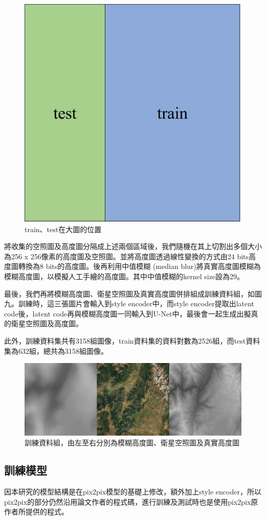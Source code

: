 \documentclass[a4paper, 12pt]{article}
\begin{document}
\begin{figure}[htbp]
    \centering
    \includegraphics[width=0.3\linewidth]{fig/9.jpg}
    \caption{train、test在大圖的位置}
    \label{fig:9}
\end{figure}

將收集的空照圖及高度圖分隔成上述兩個區域後，我們隨機在其上切割出多個大小為256 x 256像素的高度圖及空照圖。並將高度圖透過線性變換的方式由24 bits高度圖轉換為8 bits的高度圖。後再利用中值模糊 (median blur)將真實高度圖模糊為模糊高度圖，以模擬人工手繪的高度圖。其中中值模糊的kernel size設為29。

最後，我們再將模糊高度圖、衛星空照圖及真實高度圖併排組成訓練資料組，如圖九。訓練時，這三張圖片會輸入到style encoder中，而style encoder提取出latent code後，latent code再與模糊高度圖一同輸入到U-Net中，最後會一起生成出擬真的衛星空照圖及高度圖。

此外，訓練資料集共有3158組圖像，train資料集的資料對數為2526組，而test資料集為632組，總共為3158組圖像。

\begin{figure}[htbp]
    \centering
    \includegraphics[width=\linewidth]{fig/10.jpg}
    \caption{訓練資料組，由左至右分別為模糊高度圖、衛星空照圖及真實高度圖}
    \label{fig:10}
\end{figure}


\subsection{訓練模型}
因本研究的模型結構是在pix2pix模型的基礎上修改，額外加上style encoder，所以pix2pix的部分仍然沿用論文作者的程式碼，進行訓練及測試時也是使用pix2pix原作者所提供的程式。
\end{document}

